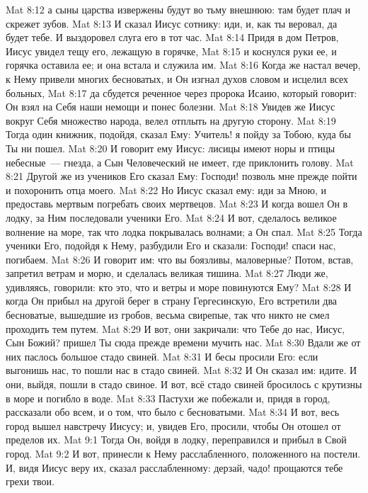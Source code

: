 \vs Mat 8:12 а сыны царства извержены будут во тьму внешнюю: там будет плач и скрежет зубов.
\vs Mat 8:13 И сказал Иисус сотнику: иди, и, как ты веровал, да будет тебе. И выздоровел слуга его в тот час.
\rsbpar\vs Mat 8:14 Придя в дом Петров, Иисус увидел тещу его, лежащую в горячке,
\vs Mat 8:15 и коснулся руки ее, и горячка оставила ее; и она встала и служила им.
\rsbpar\vs Mat 8:16 Когда же настал вечер, к Нему привели многих бесноватых, и Он изгнал духов словом и исцелил всех больных,
\vs Mat 8:17 да сбудется реченное через пророка Исаию, который говорит: Он взял на Себя наши немощи и понес болезни.
\rsbpar\vs Mat 8:18 Увидев же Иисус вокруг Себя множество народа, велел  отплыть на другую сторону.
\vs Mat 8:19 Тогда один книжник, подойдя, сказал Ему: Учитель! я пойду за Тобою, куда бы Ты ни пошел.
\vs Mat 8:20 И говорит ему Иисус: лисицы имеют норы и птицы небесные~--- гнезда, а Сын Человеческий не имеет, где приклонить голову.
\vs Mat 8:21 Другой же из учеников Его сказал Ему: Господи! позволь мне прежде пойти и похоронить отца моего.
\vs Mat 8:22 Но Иисус сказал ему: иди за Мною, и предоставь мертвым погребать своих мертвецов.
\rsbpar\vs Mat 8:23 И когда вошел Он в лодку, за Ним последовали ученики Его.
\vs Mat 8:24 И вот, сделалось великое волнение на море, так что лодка покрывалась волнами; а Он спал.
\vs Mat 8:25 Тогда ученики Его, подойдя к Нему, разбудили Его и сказали: Господи! спаси нас, погибаем.
\vs Mat 8:26 И говорит им: что вы  боязливы, маловерные? Потом, встав, запретил ветрам и морю, и сделалась великая тишина.
\vs Mat 8:27 Люди же, удивляясь, говорили: кто это, что и ветры и море повинуются Ему?
\rsbpar\vs Mat 8:28 И когда Он прибыл на другой берег в страну Гергесинскую, Его встретили два бесноватые, вышедшие из гробов, весьма свирепые, так что никто не смел проходить тем путем.
\vs Mat 8:29 И вот, они закричали: что Тебе до нас, Иисус, Сын Божий? пришел Ты сюда прежде времени мучить нас.
\vs Mat 8:30 Вдали же от них паслось большое стадо свиней.
\vs Mat 8:31 И бесы просили Его: если выгонишь нас, то пошли нас в стадо свиней.
\vs Mat 8:32 И Он сказал им: идите. И они, выйдя, пошли в стадо свиное. И вот, всё стадо свиней бросилось с крутизны в море и погибло в воде.
\vs Mat 8:33 Пастухи же побежали и, придя в город, рассказали обо всем, и о том, что было с бесноватыми.
\vs Mat 8:34 И вот, весь город вышел навстречу Иисусу; и, увидев Его, просили, чтобы Он отошел от пределов их.
\vs Mat 9:1 Тогда Он, войдя в лодку, переправился  и прибыл в Свой город.
\vs Mat 9:2 И вот, принесли к Нему расслабленного, положенного на постели. И, видя Иисус веру их, сказал расслабленному: дерзай, чадо! прощаются тебе грехи твои.
